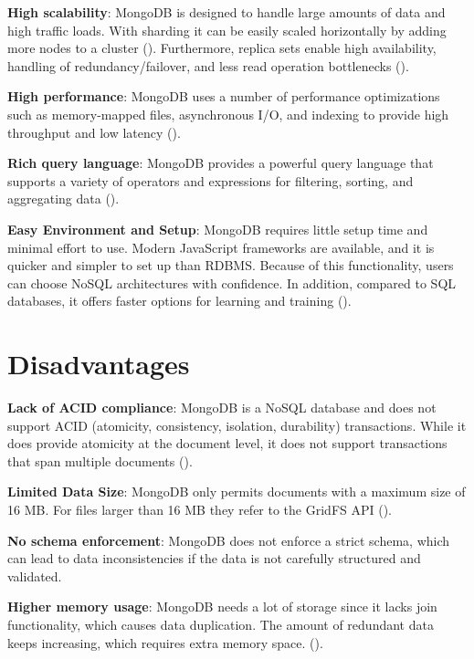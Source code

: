\textbf{High scalability}: MongoDB is designed to handle large amounts of data and high traffic loads. With sharding it can be easily scaled horizontally by adding more nodes to a cluster (\cites{mongodb-scalability}{dataflair_2018}). Furthermore, replica sets enable high availability, handling of redundancy/failover, and less read operation bottlenecks (\cite{mongodb-replica-sets}).

\textbf{High performance}: MongoDB uses a number of performance optimizations such as memory-mapped files, asynchronous I/O, and indexing to provide high throughput and low latency (\cites{mongodb-performance}{knowledgenile-pro-con}).

\textbf{Rich query language}: MongoDB provides a powerful query language that supports a variety of operators and expressions for filtering, sorting, and aggregating data (\cite{mongodb-query}).

\textbf{Easy Environment and Setup}: MongoDB requires little setup time and minimal effort to use. Modern JavaScript frameworks are available, and it is quicker and simpler to set up than RDBMS.
Because of this functionality, users can choose NoSQL architectures with confidence. In addition, compared to SQL databases, it offers faster options for learning and training (\cites{knowledgenile-pro-con}{jamsheer_2019}). 

\section{Disadvantages}
\textbf{Lack of ACID compliance}: MongoDB is a NoSQL database and does not support ACID (atomicity, consistency, isolation, durability) transactions. While it does provide atomicity at the document level, it does not support transactions that span multiple documents (\cites{mongodb-transactions}{knowledgenile-pro-con}).

\textbf{Limited Data Size}: MongoDB only permits documents with a maximum size of 16 MB. For files larger than 16 MB they refer to the GridFS API (\cite{mongodb-documents}).

\textbf{No schema enforcement}: MongoDB does not enforce a strict schema, which can lead to data inconsistencies if the data is not carefully structured and validated.

\textbf{Higher memory usage}: MongoDB needs a lot of storage since it lacks join functionality, which causes data duplication. The amount of redundant data keeps increasing, which requires extra memory space. (\cite{knowledgenile-pro-con}).

